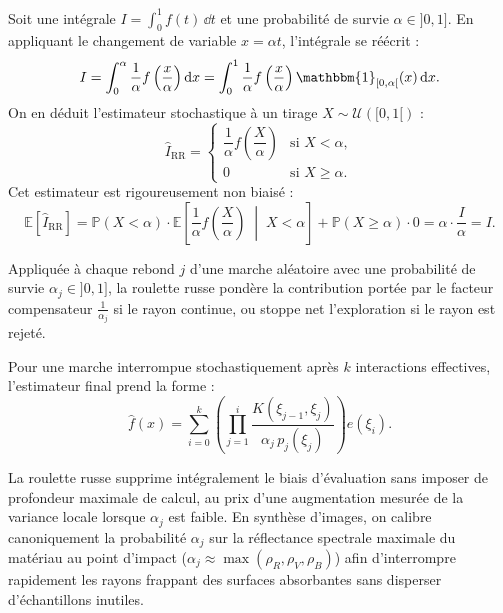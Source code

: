 \begin{proposition}
    Soit une intégrale $I = \int_0^1 f(t) \, \dd t$ et une probabilité de survie $\alpha \in ]0, 1]$. En appliquant le changement de variable $x = \alpha t$, l'intégrale se réécrit :
    \begin{equation}
        I = \int_0^\alpha \frac{1}{\alpha} f\left(\frac{x}{\alpha}\right) \dd x = \int_0^1 \frac{1}{\alpha} f\left(\frac{x}{\alpha}\right) \mathbbm{1}_{[0, \alpha[}(x) \, \dd x.
    \end{equation}
    On en déduit l'estimateur stochastique à un tirage $X \sim \mathcal{U}([0, 1[)$ :
    \begin{equation}
        \hat{I}_{\text{RR}} = 
        \begin{cases}
            \dfrac{1}{\alpha} f\left(\dfrac{X}{\alpha}\right) & \text{si } X < \alpha, \\[8pt]
            0 & \text{si } X \geqslant \alpha.
        \end{cases}
    \end{equation}
    Cet estimateur est rigoureusement non biaisé :
    \begin{equation}
        \mathbb{E}[\hat{I}_{\text{RR}}] = \mathbb{P}(X < \alpha) \cdot \mathbb{E}\left[ \frac{1}{\alpha} f\left(\frac{X}{\alpha}\right) \;\middle|\; X < \alpha \right] + \mathbb{P}(X \geqslant \alpha) \cdot 0 = \alpha \cdot \frac{I}{\alpha} = I.
    \end{equation}
\end{proposition}

Appliquée à chaque rebond $j$ d'une marche aléatoire avec une probabilité de survie $\alpha_j \in ]0, 1]$, la roulette russe pondère la contribution portée par le facteur compensateur $\frac{1}{\alpha_j}$ si le rayon continue, ou stoppe net l'exploration si le rayon est rejeté. 

Pour une marche interrompue stochastiquement après $k$ interactions effectives, l'estimateur final prend la forme :
\begin{equation}
    \boxed{\hat{f}(x) = \sum_{i=0}^k \left( \prod_{j=1}^i \frac{K(\xi_{j-1}, \xi_j)}{\alpha_j \, p_j(\xi_j)} \right) e(\xi_i)}.
\end{equation}

\begin{remark}
    La roulette russe supprime intégralement le biais d'évaluation sans imposer de profondeur maximale de calcul, au prix d'une augmentation mesurée de la variance locale lorsque $\alpha_j$ est faible. En synthèse d'images, on calibre canoniquement la probabilité $\alpha_j$ sur la réflectance spectrale maximale du matériau au point d'impact ($\alpha_j \approx \max(\rho_R, \rho_V, \rho_B)$) afin d'interrompre rapidement les rayons frappant des surfaces absorbantes sans disperser d'échantillons inutiles.
\end{remark}

